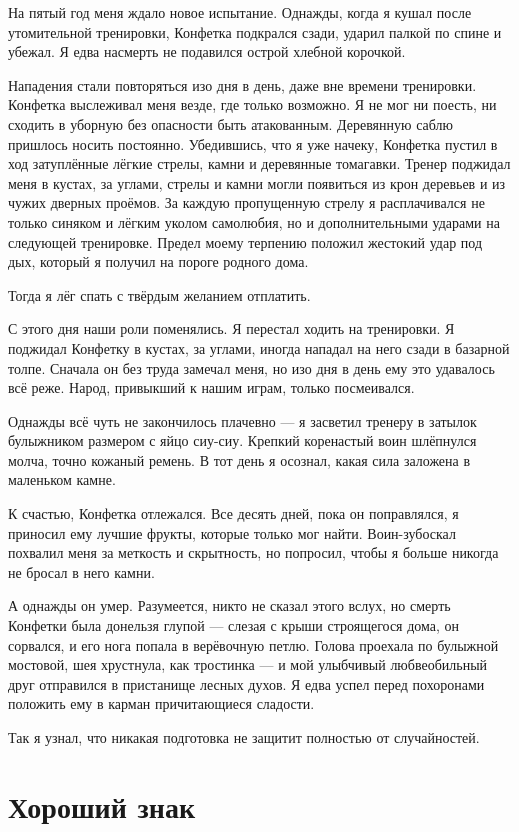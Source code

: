 На пятый год меня ждало новое испытание.
Однажды, когда я кушал после утомительной тренировки, Конфетка подкрался сзади, ударил палкой по спине и убежал.
Я едва насмерть не подавился острой хлебной корочкой.

Нападения стали повторяться изо дня в день, даже вне времени тренировки.
Конфетка выслеживал меня везде, где только возможно.
Я не мог ни поесть, ни сходить в уборную без опасности быть атакованным.
Деревянную саблю пришлось носить постоянно.
Убедившись, что я уже начеку, Конфетка пустил в ход затуплённые лёгкие стрелы, камни и деревянные томагавки.
Тренер поджидал меня в кустах, за углами, стрелы и камни могли появиться из крон деревьев и из чужих дверных проёмов.
За каждую пропущенную стрелу я расплачивался не только синяком и лёгким уколом самолюбия, но и дополнительными ударами на следующей тренировке.
Предел моему терпению положил жестокий удар под дых, который я получил на пороге родного дома.

Тогда я лёг спать с твёрдым желанием отплатить.

С этого дня наши роли поменялись.
Я перестал ходить на тренировки.
Я поджидал Конфетку в кустах, за углами, иногда нападал на него сзади в базарной толпе.
Сначала он без труда замечал меня, но изо дня в день ему это удавалось всё реже.
Народ, привыкший к нашим играм, только посмеивался.

Однажды всё чуть не закончилось плачевно --- я засветил тренеру в затылок булыжником размером с яйцо сиу-сиу.
Крепкий коренастый воин шлёпнулся молча, точно кожаный ремень.
В тот день я осознал, какая сила заложена в маленьком камне.

К счастью, Конфетка отлежался.
Все десять дней, пока он поправлялся, я приносил ему лучшие фрукты, которые только мог найти.
Воин-зубоскал похвалил меня за меткость и скрытность, но попросил, чтобы я больше никогда не бросал в него камни.

А однажды он умер.
Разумеется, никто не сказал этого вслух, но смерть Конфетки была донельзя глупой --- слезая с крыши строящегося дома, он сорвался, и его нога попала в верёвочную петлю.
Голова проехала по булыжной мостовой, шея хрустнула, как тростинка --- и мой улыбчивый любвеобильный друг отправился в пристанище лесных духов.
Я едва успел перед похоронами положить ему в карман причитающиеся сладости.

Так я узнал, что никакая подготовка не защитит полностью от случайностей.

\section{Хороший знак}

